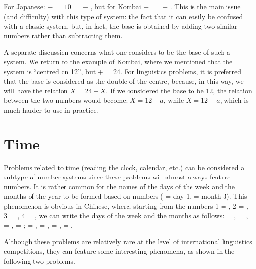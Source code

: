 \begin{refsection}
For Japanese:  $-$  $= 10 =$  $-$ , but for Kombai  $+$  $=$  $+$ . This is the main issue (and difficulty) with this type of system: the fact that it can easily be confused with a classic system, but, in fact, the base is obtained by adding two similar numbers rather than subtracting them.

A separate discussion concerns what one considers to be the base of such a system. We return to the example of Kombai, where we mentioned that the system is ``centred on 12'', but  +  = 24. For linguistics problems, it is preferred that the base is considered as the double of the centre, because, in this way, we will have the relation  $X = 24 - X$. If we considered the base to be 12, the relation between the two numbers would become: $X = 12 - a$, while  $X = 12 + a$, which is much harder to use in practice.

\section{Time}

Problems related to time (reading the clock, calendar, etc.) can be considered a subtype of number systems since these problems will almost always feature numbers. It is rather common for the names of the days of the week and the months of the year to be formed based on numbers ( = day 1,  = month 3). This phenomenon is obvious in Chinese, where, starting from the numbers 1 = {}, 2 = {}, 3 = {}, 4 = {}, we can write the days of the week and the months as follows:  = {},  = {},  = {},  = {};  = {},  = {},  = {},  = {}.

Although these problems are relatively rare at the level of international linguistics competitions, they can feature some interesting phenomena, as shown in the following two problems.


\end{refsection}
